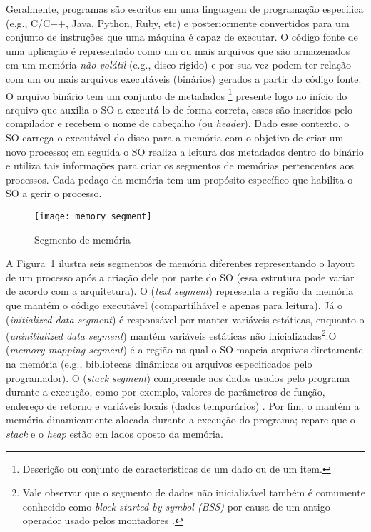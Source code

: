Geralmente, programas são escritos em uma linguagem de programação específica
(e.g., C/C++, Java, Python, Ruby, etc) e posteriormente convertidos para um
conjunto de instruções que uma máquina é capaz de executar. O código fonte de
uma aplicação é representado como um ou mais arquivos que são armazenados em um
memória \emph{não-volátil} (e.g., disco rígido) e por sua vez podem ter relação
com um ou mais arquivos executáveis (binários) gerados a partir do código
fonte. O arquivo binário tem um conjunto de metadados \footnote{Descrição ou
conjunto de características de um dado ou de um item.} presente logo no
início do arquivo que auxilia o SO a executá-lo de forma correta, esses são
inseridos pelo compilador e recebem o nome de cabeçalho (ou \textit{header}).
Dado esse contexto, o SO carrega o executável do disco para a memória com o
objetivo de criar um novo processo; em seguida o SO realiza a leitura dos
metadados dentro do binário e utiliza tais informações para criar os segmentos
de memórias pertencentes aos processos. Cada pedaço da memória tem um propósito
específico que habilita o SO a gerir o processo.

\begin{figure}[!h]
  \centering
  \texttt{[image: memory\_segment]} 
  \caption{Segmento de memória}
  \label{fig:memory_segment} 
\end{figure}

A Figura~\ref{fig:memory_segment} ilustra seis segmentos de memória diferentes
representando o layout de um processo após a criação dele por parte do SO (essa
estrutura pode variar de acordo com a arquitetura). O  (\emph{text segment}) representa a região da memória que mantém o código
executável (compartilhável e apenas para leitura). Já o  (\emph{initialized data segment}) é responsável por
manter variáveis estáticas, enquanto o  (\emph{uninitialized data segment}) mantém variáveis estáticas
não inicializadas\footnote{Vale observar que o segmento de dados não
inicializável também é comumente conhecido como \emph{block started by symbol
(BSS)} por causa de um antigo operador usado pelos montadores \citep{gdb}.}.O
 (\emph{memory mapping
segment}) é a região na qual o SO mapeia arquivos diretamente na memória (e.g.,
bibliotecas dinâmicas ou arquivos especificados pelo programador). O
 (\emph{stack segment}) compreende aos dados
usados pelo programa durante a execução, como por exemplo, valores de
parâmetros de função, endereço de retorno e variáveis locais (dados
temporários) \citep{silberschatz}.  Por fim, o 
mantém a memória dinamicamente alocada durante a execução do programa; repare
que o \emph{stack} e o \emph{heap} estão em lados oposto da memória.

